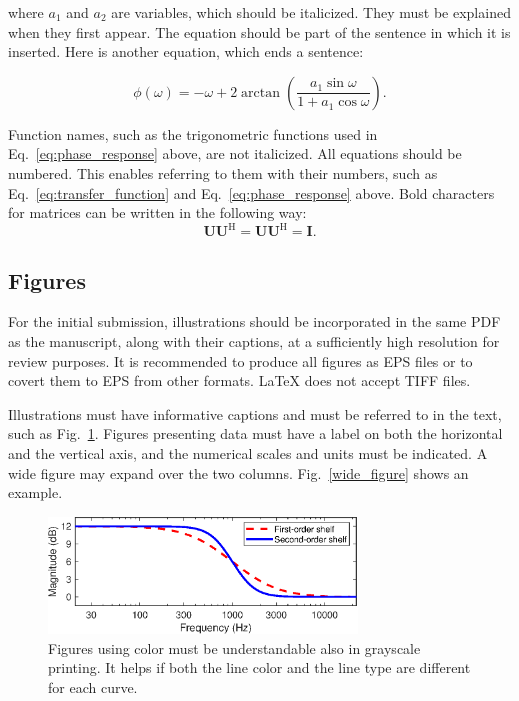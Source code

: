 \documentclass[fleqn]{jaes}
\begin{document}
\noindent where $a_1$ and $a_2$ are variables, which should be italicized. They must be explained when they first appear. The equation should be part of the sentence in which it is inserted. Here is another equation, which ends a sentence: 

\begin{equation}
\phi (\omega ) =  - \omega  + 2 \arctan \left( {\frac{{a_1 \sin \omega }}{{1 + a_1 \cos \omega }}} \right).
\label{eq:phase_response}
\end{equation}
 
\noindent Function names, such as the trigonometric functions used in Eq.~\eqref{eq:phase_response} above, are not italicized. All equations should be numbered. This enables referring to them with their numbers, such as Eq.~\eqref{eq:transfer_function} and Eq.~\eqref{eq:phase_response} above. Bold characters for matrices can be written in the following way:
\begin{equation}
\mathbf{U}\mathbf{U}^\mathrm{H} = \mathbf{U}\mathbf{U}^\mathrm{H} = \mathbf{I}.
\end{equation}

\subsection{Figures}

 For the initial submission, illustrations should be incorporated in the same PDF as the manuscript, along with their captions, at a sufficiently high resolution for review purposes. It is recommended to produce all figures as EPS files or to covert them to EPS from other formats. LaTeX does not accept TIFF files. 
 
 Illustrations must have informative captions and must be referred to in the text, such as Fig.~\ref{fig:example_figure}. Figures presenting data must have a label on both the horizontal and the vertical axis, and the numerical scales and units must be indicated. A wide figure may expand over the two columns. Fig.~\ref{wide_figure} shows an example.

\begin{figure}[t]
\centering
\includegraphics[width=82mm]{fig1_example.eps}
\caption{Figures using color must be understandable also in grayscale printing. It helps if both the line color and the line type are different for each curve.}
\label{fig:example_figure}
\end{figure}
\end{document}

